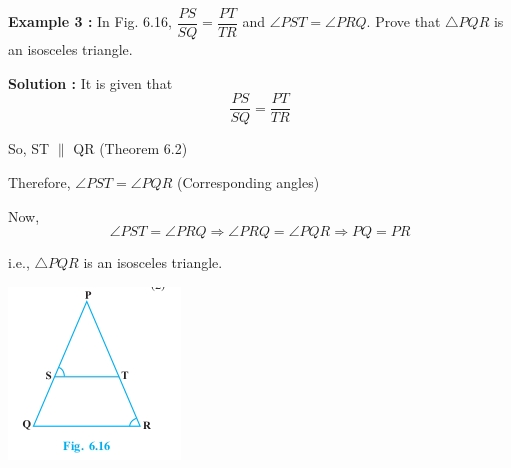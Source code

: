 \documentclass[a4paper,12pt]{article}
\begin{document}
\noindent
\begin{minipage}[t]{0.63\textwidth}
\vspace{-10em}\textcolor{ncertblue}{\textbf{Example 3 :}} In Fig. 6.16, $\dfrac{PS}{SQ} = \dfrac{PT}{TR}$ and $\angle PST = \angle PRQ$. Prove that $\triangle PQR$ is an isosceles triangle.


\textcolor{ncertblue}{\textbf{Solution :}} It is given that
\[
\frac{PS}{SQ} = \frac{PT}{TR}
\]

So, ST $\parallel$ QR \hfill (Theorem 6.2)

Therefore, $\angle PST = \angle PQR$ \hfill (Corresponding angles)

Now,
\[
\angle PST = \angle PRQ \Rightarrow \angle PRQ = \angle PQR \Rightarrow PQ = PR
\]

i.e., $\triangle PQR$ is an isosceles triangle.
\end{minipage}
\hfill
\begin{minipage}[t]{0.34\textwidth}
\centering
\includegraphics[width=\linewidth]{fig616.jpg}\\[-0.5em]
\end{minipage}
\end{document}
